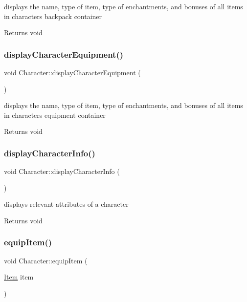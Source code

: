 displays the name, type of item, type of enchantments, and bonuses of all items in characters backpack container \begin{DoxyReturn}{Returns}
void 
\end{DoxyReturn}
\hypertarget{class_character_a813ec19baa7254c2591bc07ca53b7f3e}{}\label{class_character_a813ec19baa7254c2591bc07ca53b7f3e} 
\subsubsection{\texorpdfstring{display\+Character\+Equipment()}{displayCharacterEquipment()}}
{\footnotesize\ttfamily void Character\+::display\+Character\+Equipment (\begin{DoxyParamCaption}{ }\end{DoxyParamCaption})}

displays the name, type of item, type of enchantments, and bonuses of all items in characters equipment container \begin{DoxyReturn}{Returns}
void 
\end{DoxyReturn}
\hypertarget{class_character_a0f993af09d2137001b12ab7b7415a55b}{}\label{class_character_a0f993af09d2137001b12ab7b7415a55b} 
\subsubsection{\texorpdfstring{display\+Character\+Info()}{displayCharacterInfo()}}
{\footnotesize\ttfamily void Character\+::display\+Character\+Info (\begin{DoxyParamCaption}{ }\end{DoxyParamCaption})}

displays relevant attributes of a character \begin{DoxyReturn}{Returns}
void 
\end{DoxyReturn}
\hypertarget{class_character_a0f26eec17d32dd07f241b7a68da2adfa}{}\label{class_character_a0f26eec17d32dd07f241b7a68da2adfa} 
\subsubsection{\texorpdfstring{equip\+Item()}{equipItem()}}
{\footnotesize\ttfamily void Character\+::equip\+Item (\begin{DoxyParamCaption}\item[{\hyperlink{class_item}{Item}}]{item }\end{DoxyParamCaption})}

